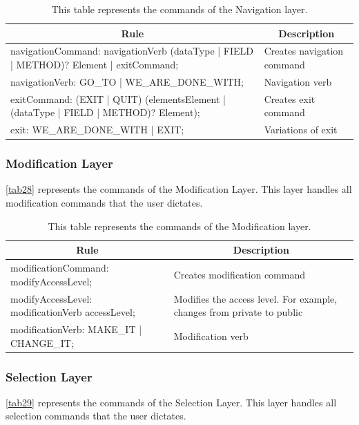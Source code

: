 \begin{table}[H]
	\centering
	\begin{tabular}{|p{8cm}|p{7cm}|}
		\hline
		\multicolumn{1}{|c|}{{\bf Rule}} & \multicolumn{1}{c|}{{\bf Description}} \\ \hline
		navigationCommand: navigationVerb (dataType | FIELD | METHOD)? Element | exitCommand; & Creates navigation command             \\ \hline
		navigationVerb: GO\_TO | WE\_ARE\_DONE\_WITH; & Navigation verb                        \\ \hline
		exitCommand: (EXIT | QUIT) (elementsElement | (dataType | FIELD | METHOD)? Element);  & Creates exit command                   \\ \hline
		exit: WE\_ARE\_DONE\_WITH | EXIT; & Variations of exit                     \\ \hline
	\end{tabular}
	\caption{This table represents the commands of the Navigation layer.}
	\label{tab27}
\end{table}

\subsubsection{Modification Layer}
\autoref{tab28} represents the commands of the Modification Layer. This layer handles all modification commands that the user dictates.

\begin{table}[H]
	\centering
	\begin{tabular}{|p{8cm}|p{7cm}|}
		\hline
		\multicolumn{1}{|c|}{{\bf Rule}}                 & \multicolumn{1}{c|}{{\bf Description}}                                 \\ \hline
		modificationCommand: modifyAccessLevel;          & Creates modification command                                           \\ \hline
		modifyAccessLevel: modificationVerb accessLevel; & Modifies the access level. For example, changes from private to public \\ \hline
		modificationVerb: MAKE\_IT | CHANGE\_IT;         & Modification verb                                                      \\ \hline
	\end{tabular}
	\caption{This table represents the commands of the Modification layer.}
	\label{tab28}
\end{table}

\subsubsection{Selection Layer}
\autoref{tab29} represents the commands of the Selection Layer.  This layer handles all selection commands that the user dictates.

